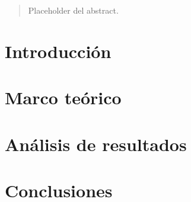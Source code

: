 \begin{abstract}
  Placeholder del abstract.
\end{abstract}
\section{Introducción}
\section{Marco teórico}
\section{Análisis de resultados}
\section{Conclusiones}
